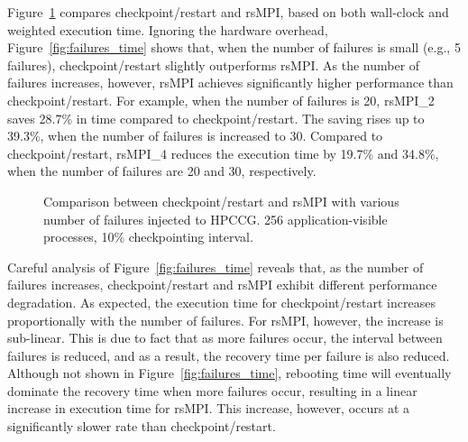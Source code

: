 Figure~\ref{fig:multiple_failure} compares checkpoint/restart and rsMPI, based on both wall-clock and weighted execution time. Ignoring the hardware overhead, Figure~\ref{fig:failures_time} shows that, when the number of failures is small (e.g., 5 failures), checkpoint/restart slightly outperforms rsMPI. As the number of failures increases, however, rsMPI achieves significantly higher performance than checkpoint/restart. For example, when the number of failures is 20, rsMPI\_2 saves 28.7\% in time compared to checkpoint/restart. The saving rises up to 39.3\%, when the number of failures is increased to $30$. Compared to checkpoint/restart, rsMPI\_4 reduces the execution time by 19.7\% and 34.8\%, when the number of failures are 20 and 30, respectively. 

\begin{figure}[!t]
  \begin{center}
  \end{center}
  \caption{Comparison between checkpoint/restart and rsMPI with various number of failures injected to HPCCG. 256 application-visible processes, 10\% checkpointing interval.}
  \label{fig:multiple_failure}
\end{figure}


Careful analysis of Figure~\ref{fig:failures_time} reveals that, as the number of failures increases, checkpoint/restart and rsMPI exhibit different performance degradation. As expected, the execution time for checkpoint/restart increases proportionally with the number of failures. For rsMPI, however, the increase is sub-linear. This is due to fact that as more failures occur, the interval between failures is reduced, and as a result, the recovery time per failure is also reduced. Although not shown in Figure~\ref{fig:failures_time}, rebooting time will eventually dominate the recovery time when more failures occur, resulting in a linear increase in execution time for rsMPI. This increase, however, occurs at a significantly slower rate than checkpoint/restart.

